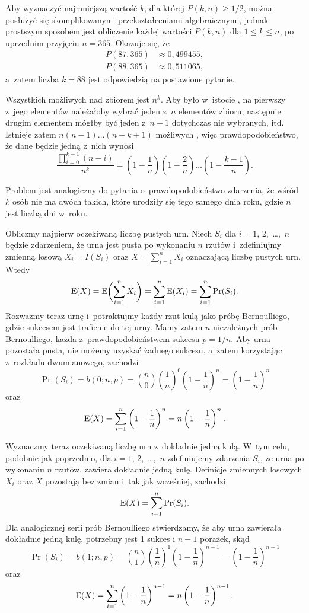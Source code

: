 Aby wyznaczyć najmniejszą wartość $k$, dla której $P(k,n)\ge1/2$, można posłużyć się skomplikowanymi przekształceniami algebraicznymi, jednak prostszym sposobem jest obliczenie każdej wartości $P(k,n)$ dla $1\le k\le n$, po uprzednim przyjęciu $n=365$. Okazuje się, że
\begin{align*}
	P(87,365) &\approx 0{,}499455, \\
	P(88,365) &\approx 0{,}511065,
\end{align*}
a~zatem liczba $k=88$ jest odpowiedzią na postawione pytanie.

\exercise %
Wszystkich możliwych  nad zbiorem  jest $n^k$. Aby  było w~istocie , na pierwszy z~jego elementów należałoby wybrać jeden z~$n$ elementów zbioru, następnie drugim elementem mógłby być jeden z~$n-1$ dotychczas nie wybranych, itd. Istnieje zatem $n(n-1)\dots(n-k+1)$ możliwych , więc prawdopodobieństwo, że dane  będzie jedną z~nich wynosi
\[
	\frac{\prod_{i=0}^{k-1}(n-i)}{n^k} = \left(1-\frac{1}{n}\right)\left(1-\frac{2}{n}\right)\dots\left(1-\frac{k-1}{n}\right).
\]

Problem jest analogiczny do pytania o~prawdopodobieństwo zdarzenia, że wśród $k$ osób nie ma dwóch takich, które urodziły się tego samego dnia roku, gdzie $n$ jest liczbą dni w~roku.

\exercise %
Obliczmy najpierw oczekiwaną liczbę pustych urn. Niech $S_i$ dla $i=1$, 2,~\dots,~$n$ będzie zdarzeniem, że  urna jest pusta po wykonaniu $n$ rzutów i~zdefiniujmy zmienną losową $X_i=I(S_i)$ oraz $X=\sum_{i=1}^nX_i$ oznaczającą liczbę pustych urn. Wtedy
\[
	\operatorname{E}(X) = \operatorname{E}\biggl(\sum_{i=1}^nX_i\biggr) = \sum_{i=1}^n\operatorname{E}(X_i) = \sum_{i=1}^n\Pr(S_i).
\]
Rozważmy teraz  urnę i~potraktujmy każdy rzut kulą jako próbę Bernoulliego, gdzie sukcesem jest trafienie do tej urny. Mamy zatem $n$ niezależnych prób Bernoulliego, każda z~prawdopodobieństwem sukcesu $p=1/n$. Aby  urna pozostała pusta, nie możemy uzyskać żadnego sukcesu, a~zatem korzystając z~rozkładu dwumianowego, zachodzi
\[
	\Pr(S_i) = b(0;n,p) = \binom{n}{0}\left(\frac{1}{n}\right)^0\left(1-\frac{1}{n}\right)^n = \left(1-\frac{1}{n}\right)^n
\]
oraz
\[
	\operatorname{E}(X) = \sum_{i=1}^n\left(1-\frac{1}{n}\right)^n = n\left(1-\frac{1}{n}\right)^n.
\]

Wyznaczmy teraz oczekiwaną liczbę urn z~dokładnie jedną kulą. W~tym celu, podobnie jak poprzednio, dla $i=1$, 2,~\dots,~$n$ zdefiniujemy zdarzenia $S_i$, że  urna po wykonaniu $n$ rzutów, zawiera dokładnie jedną kulę. Definicje zmiennych losowych $X_i$ oraz $X$ pozostają bez zmian i~tak jak wcześniej, zachodzi
\[
	\operatorname{E}(X) = \sum_{i=1}^n\Pr(S_i).
\]
Dla analogicznej serii prób Bernoulliego stwierdzamy, że aby  urna zawierała dokładnie jedną kulę, potrzebny jest 1 sukces i $n-1$ porażek, skąd
\[
	\Pr(S_i) = b(1;n,p) = \binom{n}{1}\left(\frac{1}{n}\right)^1\left(1-\frac{1}{n}\right)^{n-1} = \left(1-\frac{1}{n}\right)^{n-1}
\]
oraz
\[
	\operatorname{E}(X) = \sum_{i=1}^n\left(1-\frac{1}{n}\right)^{n-1} = n\left(1-\frac{1}{n}\right)^{n-1}.
\]

